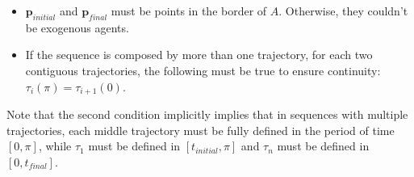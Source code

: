 \begin{itemize}

\item{$\mathbf{p}_{initial}$ and $\mathbf{p}_{final}$ must be points in the border of $A$. Otherwise, they couldn't be exogenous agents.}

\item{If the sequence is composed by more than one trajectory, for each two contiguous trajectories, the following must be true to ensure continuity: $\tau_i(\pi) = \tau_{i+1}(0)$.}

\end{itemize}

Note that the second condition implicitly implies that in sequences with multiple trajectories, each middle trajectory must be fully defined in the period of time $[0,\pi]$, while $\tau_1$ must be defined in $[t_{initial},\pi]$ and $\tau_n$ must be defined in $[0, t_{final}]$.

